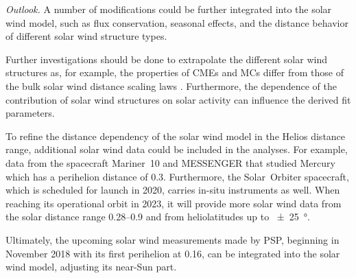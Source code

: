 \noindent \textit{Outlook.}
A number of modifications could be further integrated into the solar wind model, such as flux conservation, seasonal effects, and the distance behavior of different solar wind structure types.

Further investigations should be done to extrapolate the different solar wind structures as, for example, the properties of CMEs and MCs differ from those of the bulk solar wind distance scaling laws \citep{Bothmer1998}. Furthermore, the dependence of the contribution of solar wind structures on solar activity can influence the derived fit parameters.

To refine the distance dependency of the solar wind model in the Helios distance range, additional solar wind data could be included in the analyses. For example, data from the spacecraft Mariner~10 and MESSENGER that studied Mercury which has a perihelion distance of \SI{0.3}{\au}.
Furthermore, the Solar~Orbiter spacecraft, which is scheduled for launch in 2020, carries in-situ instruments as well. When reaching its operational orbit in 2023, it will provide more solar wind data from the solar distance range \SIrange{0.28}{0.9}{\au} and from heliolatitudes up to \SI{+-25}{\degree}.

Ultimately, the upcoming solar wind measurements made by PSP, beginning in November 2018 with its first perihelion at \SI{0.16}{\au}, can be integrated into the solar wind model, adjusting its near-Sun part.




